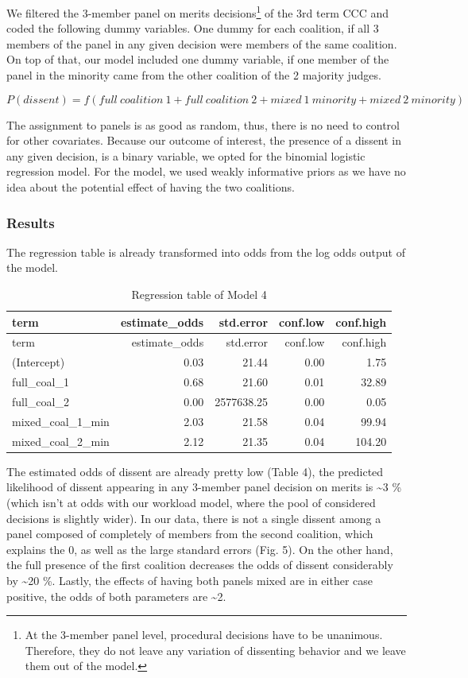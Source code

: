 \documentclass[
  11pt,
]{article}
\begin{document}
We filtered the 3-member panel on merits decisions\footnote{At the
  3-member panel level, procedural decisions have to be unanimous.
  Therefore, they do not leave any variation of dissenting behavior and
  we leave them out of the model.} of the 3rd term CCC and coded the
following dummy variables. One dummy for each coalition, if all 3
members of the panel in any given decision were members of the same
coalition. On top of that, our model included one dummy variable, if one
member of the panel in the minority came from the other coalition of the
2 majority judges.

\[
P(dissent) = f(full\:coalition\:1 + full\:coalition\:2 + mixed\:1\:minority + mixed\:2\:minority)
\]

The assignment to panels is as good as random, thus, there is no need to
control for other covariates. Because our outcome of interest, the
presence of a dissent in any given decision, is a binary variable, we
opted for the binomial logistic regression model. For the model, we used
weakly informative priors as we have no idea about the potential effect
of having the two coalitions.

\hypertarget{results-2}{%
\subsubsection{Results}\label{results-2}}

The regression table is already transformed into odds from the log odds
output of the model.

\begin{longtable}[]{@{}lrrrr@{}}
\caption{Regression table of Model 4}\tabularnewline
\toprule\noalign{}
term & estimate\_odds & std.error & conf.low & conf.high \\
\midrule\noalign{}
\endfirsthead
\toprule\noalign{}
term & estimate\_odds & std.error & conf.low & conf.high \\
\midrule\noalign{}
\endhead
\bottomrule\noalign{}
\endlastfoot
(Intercept) & 0.03 & 21.44 & 0.00 & 1.75 \\
full\_coal\_1 & 0.68 & 21.60 & 0.01 & 32.89 \\
full\_coal\_2 & 0.00 & 2577638.25 & 0.00 & 0.05 \\
mixed\_coal\_1\_min & 2.03 & 21.58 & 0.04 & 99.94 \\
mixed\_coal\_2\_min & 2.12 & 21.35 & 0.04 & 104.20 \\
\end{longtable}

The estimated odds of dissent are already pretty low (Table 4), the
predicted likelihood of dissent appearing in any 3-member panel decision
on merits is \textasciitilde3 \% (which isn't at odds with our workload
model, where the pool of considered decisions is slightly wider). In our
data, there is not a single dissent among a panel composed of completely
of members from the second coalition, which explains the 0, as well as
the large standard errors (Fig. 5). On the other hand, the full presence
of the first coalition decreases the odds of dissent considerably by
\textasciitilde20 \%. Lastly, the effects of having both panels mixed
are in either case positive, the odds of both parameters are
\textasciitilde2.
\end{document}
